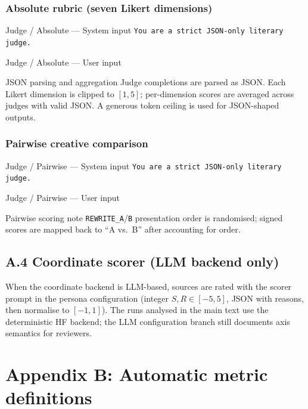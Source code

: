 \subsubsection{Absolute rubric (seven Likert dimensions)}
\begin{PromptSystemBox}{Judge / Absolute --- System input}
\texttt{You are a strict JSON-only literary judge.}
\end{PromptSystemBox}
\begin{PromptUserBox}{Judge / Absolute --- User input}
\end{PromptUserBox}
\begin{DefnBox}{JSON parsing and aggregation}
Judge completions are parsed as JSON. Each Likert dimension is clipped to $[1,5]$; per-dimension scores are averaged across judges with valid JSON. A generous token ceiling is used for JSON-shaped outputs.
\end{DefnBox}

\subsubsection{Pairwise creative comparison}
\begin{PromptSystemBox}{Judge / Pairwise --- System input}
\texttt{You are a strict JSON-only literary judge.}
\end{PromptSystemBox}
\begin{PromptUserBox}{Judge / Pairwise --- User input}
\end{PromptUserBox}
\begin{DefnBox}{Pairwise scoring note}
\texttt{REWRITE\_A}/\texttt{B} presentation order is randomised; signed scores are mapped back to ``A vs.\ B'' after accounting for order.
\end{DefnBox}

\subsection{A.4 Coordinate scorer (LLM backend only)}
When the coordinate backend is LLM-based, sources are rated with the scorer prompt in the persona configuration (integer $S,R\in[-5,5]$, JSON with reasons, then normalise to $[-1,1]$). The runs analysed in the main text use the deterministic HF backend; the LLM configuration branch still documents axis semantics for reviewers.

\section{Appendix B: Automatic metric definitions}
\label{app:metrics}

